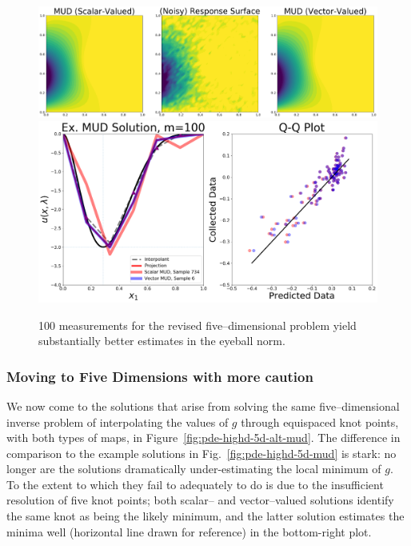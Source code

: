 \begin{figure}[htbp]
\centering
  \includegraphics[width=0.95\linewidth]{figures/pde-highd/pde-highd_surf_exmud_D5-alt_m100}
  \includegraphics[width=0.9\linewidth]{figures/pde-highd/pde-highd-alt_comp_exmud_D5_m100}
\caption{
100 measurements for the revised five--dimensional problem yield substantially better estimates in the eyeball norm.
}
\label{fig:pde-highd-5d-alt-example}
\end{figure}


\subsubsection{Moving to Five Dimensions with more caution}

We now come to the solutions that arise from solving the same five--dimensional inverse problem of interpolating the values of $g$ through equispaced knot points, with both types of maps, in Figure~\ref{fig:pde-highd-5d-alt-mud}.
The difference in comparison to the example solutions in Fig.~\ref{fig:pde-highd-5d-mud} is stark: no longer are the solutions dramatically under-estimating the local minimum of $g$.
To the extent to which they fail to adequately to do is due to the insufficient resolution of five knot points; both scalar-- and vector--valued solutions identify the same knot as being the likely minimum, and the latter solution estimates the minima well (horizontal line drawn for reference) in the bottom-right plot.

